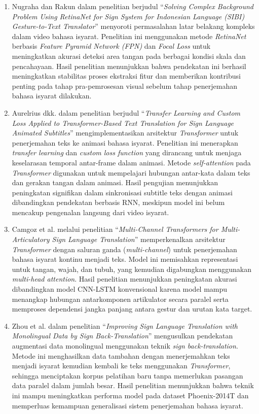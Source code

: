 \begin{enumerate}[noitemsep]
	\item Nugraha dan Rakun \cite{MHNugraha2022} dalam penelitian berjudul ``\textit{Solving Complex Background Problem Using RetinaNet for Sign System for Indonesian Language (SIBI) Gesture-to-Text Translator}'' menyoroti permasalahan latar belakang kompleks dalam video bahasa isyarat. Penelitian ini menggunakan metode \textit{RetinaNet} berbasis \textit{Feature Pyramid Network (FPN)} dan \textit{Focal Loss} untuk meningkatkan akurasi deteksi area tangan pada berbagai kondisi skala dan pencahayaan. Hasil penelitian menunjukkan bahwa pendekatan ini berhasil meningkatkan stabilitas proses ekstraksi fitur dan memberikan kontribusi penting pada tahap pra-pemrosesan visual sebelum tahap penerjemahan bahasa isyarat dilakukan.
	\item Aurelrius dkk. \cite{Aurelrius2025} dalam penelitian berjudul ``\textit{Transfer Learning and Custom Loss Applied to Transformer-Based Text Translation for Sign Language Animated Subtitles}'' mengimplementasikan arsitektur \textit{Transformer} untuk penerjemahan teks ke animasi bahasa isyarat. Penelitian ini menerapkan \textit{transfer learning} dan \textit{custom loss function} yang dirancang untuk menjaga keselarasan temporal antar-frame dalam animasi. Metode \textit{self-attention} pada \textit{Transformer} digunakan untuk mempelajari hubungan antar-kata dalam teks dan gerakan tangan dalam animasi. Hasil pengujian menunjukkan peningkatan signifikan dalam sinkronisasi subtitle teks dengan animasi dibandingkan pendekatan berbasis RNN, meskipun model ini belum mencakup pengenalan langsung dari video isyarat.

	\item Camgoz et al. \cite{NCCamgoz2021} melalui penelitian ``\textit{Multi-Channel Transformers for Multi-Articulatory Sign Language Translation}'' memperkenalkan arsitektur \textit{Transformer} dengan saluran ganda (\textit{multi-channel}) untuk penerjemahan bahasa isyarat kontinu menjadi teks. Model ini memisahkan representasi untuk tangan, wajah, dan tubuh, yang kemudian digabungkan menggunakan \textit{multi-head attention}. Hasil penelitian menunjukkan peningkatan akurasi dibandingkan model CNN-LSTM konvensional karena model mampu menangkap hubungan antarkomponen artikulator secara paralel serta memproses dependensi jangka panjang antara gestur dan urutan kata target.
	\item Zhou et al. \cite{Zhou2021} dalam penelitian ``\textit{Improving Sign Language Translation with Monolingual Data by Sign Back-Translation}'' mengusulkan pendekatan augmentasi data monolingual menggunakan teknik \textit{sign back-translation}. Metode ini menghasilkan data tambahan dengan menerjemahkan teks menjadi isyarat kemudian kembali ke teks menggunakan \textit{Transformer}, sehingga menciptakan korpus pelatihan baru tanpa memerlukan pasangan data paralel dalam jumlah besar. Hasil penelitian menunjukkan bahwa teknik ini mampu meningkatkan performa model pada dataset Phoenix-2014T dan memperluas kemampuan generalisasi sistem penerjemahan bahasa isyarat.

\end{enumerate}

